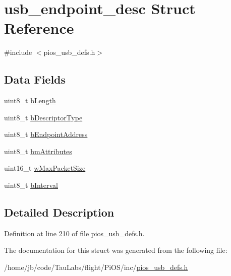 \hypertarget{structusb__endpoint__desc}{\section{usb\-\_\-endpoint\-\_\-desc \-Struct \-Reference}
\label{structusb__endpoint__desc}
}


{\ttfamily \#include $<$pios\-\_\-usb\-\_\-defs.\-h$>$}

\subsection*{\-Data \-Fields}
\begin{DoxyCompactItemize}
\item 
uint8\-\_\-t \hyperlink{group___p_i_o_s___u_s_b___d_e_f_s_ga3daed87cea9dc19fad38317f997d0623}{b\-Length}
\item 
uint8\-\_\-t \hyperlink{group___p_i_o_s___u_s_b___d_e_f_s_gac7354b96862dc19507c70b22d8f6da99}{b\-Descriptor\-Type}
\item 
uint8\-\_\-t \hyperlink{group___p_i_o_s___u_s_b___d_e_f_s_ga8ad9f61bd28c162a904025d1c3df16fb}{b\-Endpoint\-Address}
\item 
uint8\-\_\-t \hyperlink{group___p_i_o_s___u_s_b___d_e_f_s_gae9b9321924c915afb3ae2b6849b1d86c}{bm\-Attributes}
\item 
uint16\-\_\-t \hyperlink{group___p_i_o_s___u_s_b___d_e_f_s_gabf689a07ed6891470fe9f48ea36ccd02}{w\-Max\-Packet\-Size}
\item 
uint8\-\_\-t \hyperlink{group___p_i_o_s___u_s_b___d_e_f_s_ga7d36b247562b49fe4cc7824d9ee0894e}{b\-Interval}
\end{DoxyCompactItemize}


\subsection{\-Detailed \-Description}


\-Definition at line 210 of file pios\-\_\-usb\-\_\-defs.\-h.



\-The documentation for this struct was generated from the following file\-:\begin{DoxyCompactItemize}
\item 
/home/jb/code/\-Tau\-Labs/flight/\-Pi\-O\-S/inc/\hyperlink{pios__usb__defs_8h}{pios\-\_\-usb\-\_\-defs.\-h}\end{DoxyCompactItemize}
